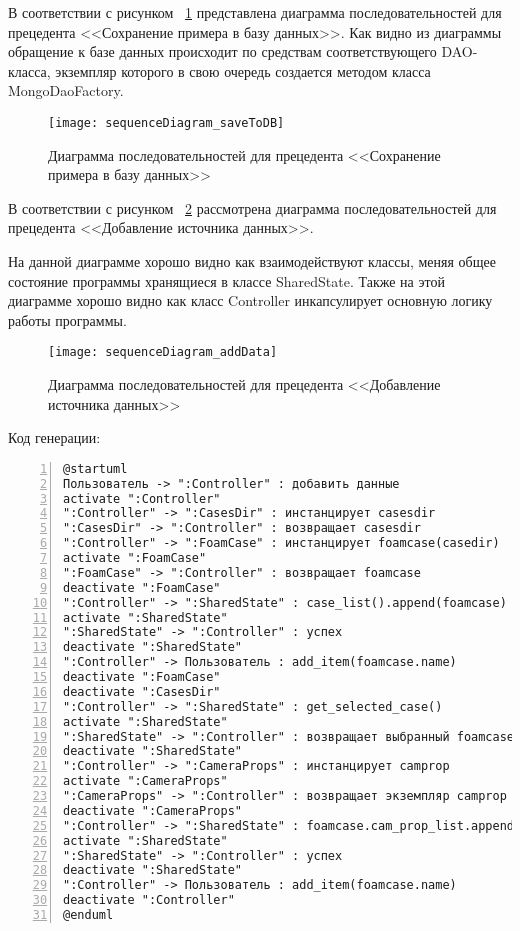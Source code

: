 \documentclass[14pt]{extreport}
\begin{document}
В соответствии с рисунком ~\ref{fig10} представлена диаграмма последовательностей для прецедента <<Сохранение примера в базу данных>>.
Как видно из диаграммы обращение к базе данных происходит по средствам соответствующего DAO-класса, экземпляр которого в свою очередь создается методом класса MongoDaoFactory.
\begin{figure}[H]
\centerline{\texttt{[image: sequenceDiagram\_saveToDB]}}
\caption{Диаграмма последовательностей для прецедента <<Сохранение примера в базу данных>>}
\label{fig10}
\end{figure}

В соответствии с рисунком ~\ref{fig11} рассмотрена диаграмма последовательностей для прецедента <<Добавление источника данных>>. 

На данной диаграмме хорошо видно как взаимодействуют классы, меняя общее состояние программы хранящиеся в классе SharedState. Также на этой диаграмме хорошо видно как класс Controller инкапсулирует основную логику работы программы.

\begin{figure}[H]
	\centerline{\texttt{[image: sequenceDiagram\_addData]}}
	\caption{Диаграмма последовательностей для прецедента <<Добавление источника данных>>}
	\label{fig11}
\end{figure}

 Код генерации:
\begin{Verbatim}[numbers=left,xleftmargin=5mm,fontsize=\small]
@startuml
Пользователь -> ":Controller" : добавить данные
activate ":Controller"
":Controller" -> ":CasesDir" : инстанцирует casesdir
":CasesDir" -> ":Controller" : возвращает casesdir
":Controller" -> ":FoamCase" : инстанцирует foamcase(casedir)
activate ":FoamCase"
":FoamCase" -> ":Controller" : возвращает foamcase
deactivate ":FoamCase"
":Controller" -> ":SharedState" : case_list().append(foamcase)
activate ":SharedState"
":SharedState" -> ":Controller" : успех
deactivate ":SharedState"
":Controller" -> Пользователь : add_item(foamcase.name)
deactivate ":FoamCase"
deactivate ":CasesDir"
":Controller" -> ":SharedState" : get_selected_case() 
activate ":SharedState"
":SharedState" -> ":Controller" : возвращает выбранный foamcase
deactivate ":SharedState"
":Controller" -> ":CameraProps" : инстанцирует camprop
activate ":CameraProps"
":CameraProps" -> ":Controller" : возвращает экземпляр camprop
deactivate ":CameraProps"
":Controller" -> ":SharedState" : foamcase.cam_prop_list.append(camprop)
activate ":SharedState"
":SharedState" -> ":Controller" : успех
deactivate ":SharedState"
":Controller" -> Пользователь : add_item(foamcase.name)
deactivate ":Controller"
@enduml
\end{Verbatim}
\end{document}
